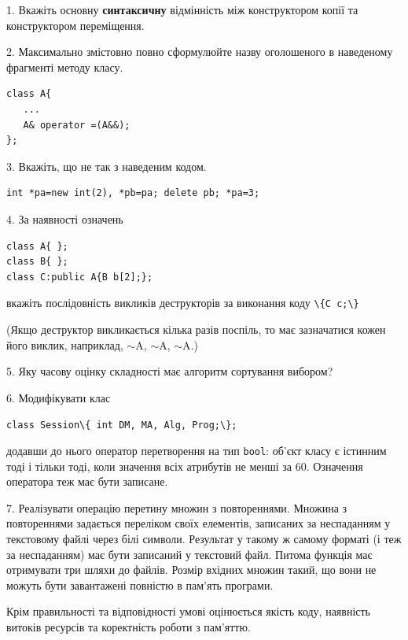 \documentclass[12pt, ukrainian]{article}
\def\code#1{\Verb!#1!}
\begin{document}
{%
1. Вкажіть основну \textbf{синтаксичну} відмінність між конструктором копії та конструктором переміщення.%
\par
\vspace{2mm}
2. Максимально змістовно повно сформулюйте назву оголошеного в наведеному фрагменті методу класу.
\vspace{-3mm}
\begin{verbatim}class A{
   ...
   A& operator =(A&&);
};\end{verbatim}
\vspace{-3mm}
\par
\vspace{2mm}
3. Вкажіть, що не так з наведеним кодом.
\vspace{-3mm}
\begin{verbatim}int *pa=new int(2), *pb=pa; delete pb; *pa=3;\end{verbatim}
\vspace{-3mm}
\par
\vspace{2mm}
4. За наявності означень
\vspace{-3mm}
\begin{verbatim}
class A{ };
class B{ };
class C:public A{B b[2];};\end{verbatim}
\vspace{-3mm}
вкажіть послідовність викликів деструкторів за виконання коду \code{\{C c;\}} 

(Якщо деструктор викликається кілька разів поспіль, то має зазначатися кожен його виклик, наприклад, $\sim$A, $\sim$A, $\sim$A.)

\vspace{2mm}
5. Яку часову оцінку складності має алгоритм сортування вибором?
\par
\vspace{2mm}
6. Модифікувати клас 

\qquad\code{class Session\{ int DM, MA, Alg, Prog;\};} 


додавши до нього оператор перетворення на тип \code{bool}: об'єкт класу є істинним тоді і тільки тоді, коли значення всіх атрибутів не менші за 60. Означення оператора теж має бути записане.%
\par
\vspace{2mm}
7. 
Реалізувати операцію перетину множин з повтореннями. Множина з повтореннями задається переліком своїх елементів, записаних за неспаданням у текстовому файлі через білі символи. Результат у такому ж самому форматі (і теж за неспаданням) має бути записаний у текстовий файл. Питома функція має отримувати три шляхи до файлів. Розмір вхідних множин такий, що вони не можуть бути завантажені повністю в пам’ять програми.

Крім правильності та відповідності умові оцінюється якість коду, наявність витоків ресурсів та коректність роботи з пам'яттю. 

}
\end{document}
